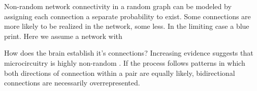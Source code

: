 Non-random network connectivity in a random graph can be modeled by assigning each connection a separate probability to exist. Some connections are more likely to be realized in the network, some less. In the limiting case a blue print. Here we assume a network with 

How does the brain establish it's connections? Increasing evidence suggests that microcircuitry is highly non-random \cite{Song2005,Perin2011}. If the process follows patterns in which both directions of connection within a pair are equally likely, bidirectional connections are necessarily overrepresented.
